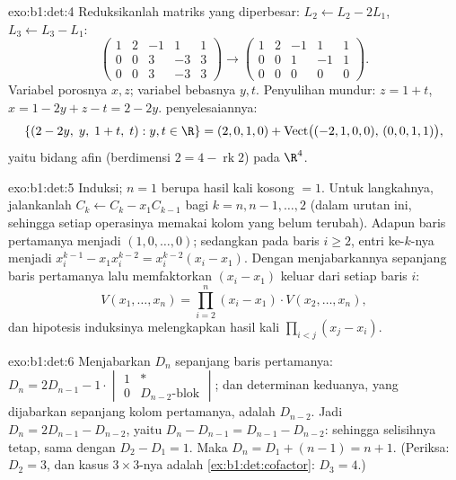\begin{solution}{exo:b1:det:4}
Reduksikanlah matriks yang diperbesar: $L_2 \leftarrow L_2 - 2L_1$, $L_3
\leftarrow L_3 - L_1$:
\[
\begin{pmatrix}
1 & 2 & -1 & 1 & 1\\
0 & 0 & 3 & -3 & 3\\
0 & 0 & 3 & -3 & 3
\end{pmatrix}
\to
\begin{pmatrix}
1 & 2 & -1 & 1 & 1\\
0 & 0 & 1 & -1 & 1\\
0 & 0 & 0 & 0 & 0
\end{pmatrix}.
\]
Variabel porosnya $x, z$; variabel bebasnya $y, t$. Penyulihan mundur: $z =
1 + t$, $x = 1 - 2y + z - t = 2 - 2y$.  penyelesaiannya:
\[
\{(2 - 2y,\; y,\; 1 + t,\; t) : y, t \in \R\}
= (2, 0, 1, 0) + \operatorname{Vect}\bigl((-2,1,0,0),\,
(0,0,1,1)\bigr),
\]
yaitu bidang afin (berdimensi $2 = 4 - \operatorname{rk} 2$) pada $\R^4$.
\end{solution}

\begin{solution}{exo:b1:det:5}
Induksi; $n = 1$ berupa hasil kali kosong $= 1$. Untuk langkahnya, jalankanlah
$C_k \leftarrow C_k - x_1 C_{k-1}$ bagi $k = n, n-1, \dots, 2$ (dalam
urutan ini, sehingga setiap operasinya memakai kolom yang belum terubah). Adapun
baris pertamanya menjadi $(1, 0, \dots, 0)$; sedangkan pada baris $i \geq 2$, entri
ke-$k$-nya menjadi $x_i^{k-1} - x_1 x_i^{k-2} = x_i^{k-2}(x_i - x_1)$.
Dengan menjabarkannya sepanjang baris pertamanya lalu memfaktorkan $(x_i - x_1)$ keluar dari
setiap baris $i$:
\[
V(x_1, \dots, x_n)
= \prod_{i=2}^{n} (x_i - x_1)\cdot V(x_2, \dots, x_n),
\]
dan hipotesis induksinya melengkapkan hasil kali $\prod_{i<j}(x_j
- x_i)$.
\end{solution}

\begin{solution}{exo:b1:det:6}
Menjabarkan $D_n$ sepanjang baris pertamanya: $D_n = 2 D_{n-1} -
1\cdot\begin{vmatrix} 1 & \ast\\ 0 & D_{n-2}\text{-blok}
\end{vmatrix}$; dan determinan keduanya, yang dijabarkan sepanjang kolom
pertamanya, adalah $D_{n-2}$. Jadi $D_n = 2D_{n-1} - D_{n-2}$, yaitu $D_n -
D_{n-1} = D_{n-1} - D_{n-2}$: sehingga selisihnya tetap, sama dengan
$D_2 - D_1 = 1$. Maka $D_n = D_1 + (n - 1) = n + 1$.
(Periksa: $D_2 = 3$, dan kasus $3\times3$-nya adalah
\cref{ex:b1:det:cofactor}: $D_3 = 4$.)
\end{solution}

